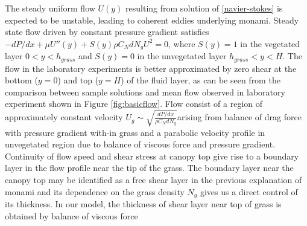 \documentclass[aps,prl,twocolumn,showpacs,superscriptaddress,groupedaddress,10pt]{revtex4-1}  %
\newcommand{\bu}{\mathbf{u}}
\newcommand{\del}{\partial}
\begin{document}
\newline
The steady uniform flow $U(y)$ resulting from solution of \eqref{navier-stokes} is expected to be unstable, leading to coherent eddies underlying monami. Steady state flow driven by   
constant pressure gradient satisfies
$-{dP}/{dx}+\mu U''(y) +S(y) \rho C_N d N_gU^2=0$, where $S(y)=1$ in the vegetated layer $0<y<h_{grass}$ and $S(y)=0$ in the unvegetated layer $h_{grass}< y< H$. 
The flow in the laboratory experiments is better approximated by zero shear at the bottom ($y=0$) and top ($y=H$) of the fluid layer, as can be seen from the comparison 
between sample solutions and mean flow observed in laboratory experiment shown in Figure \ref{fig:basicflow}. Flow consist of a region of approximately constant velocity
\small$U_g \sim \sqrt{\frac{dP/dx}{\rho C_N dN_g}}$\normalsize arising from balance of drag force with pressure gradient with-in grass and a parabolic velocity 
profile in unvegetated region due to balance of viscous force and pressure gradient. Continuity of flow speed and shear stress at canopy top 
give rise to a boundary layer in the flow profile near the tip of the grass. The boundary layer near the canopy top may be identified 
as a free shear layer\cite{Ghisal02} in the previous explanation of monami and its dependence on the grass density $N_g$ gives us a direct control of its thickness. 
In our model, the thickness of shear layer near top of grass is obtained by balance of viscous force 
\end{document}
